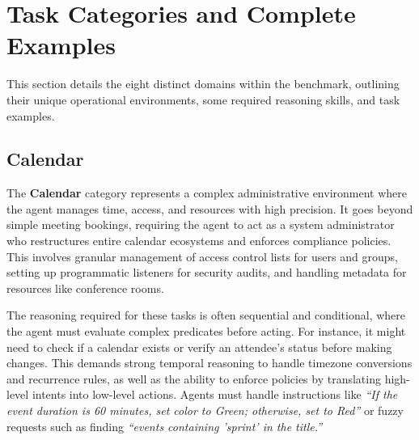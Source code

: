 \section{Task Categories and Complete Examples}
\label{app:categories_sec}
This section details the eight distinct domains within the benchmark, outlining their unique operational environments, some required reasoning skills, and task examples.

\subsection{Calendar}
\label{app:cat_calendar}

The \textbf{Calendar} category represents a complex administrative environment where the agent manages time, access, and resources with high precision. It goes beyond simple meeting bookings, requiring the agent to act as a system administrator who restructures entire calendar ecosystems and enforces compliance policies. This involves granular management of access control lists for users and groups, setting up programmatic listeners for security audits, and handling metadata for resources like conference rooms.

The reasoning required for these tasks is often sequential and conditional, where the agent must evaluate complex predicates before acting. For instance, it might need to check if a calendar exists or verify an attendee's status before making changes. This demands strong temporal reasoning to handle timezone conversions and recurrence rules, as well as the ability to enforce policies by translating high-level intents into low-level actions. Agents must handle instructions like \textit{``If the event duration is 60 minutes, set color to Green; otherwise, set to Red''} or fuzzy requests such as finding \textit{``events containing 'sprint' in the title.''}

